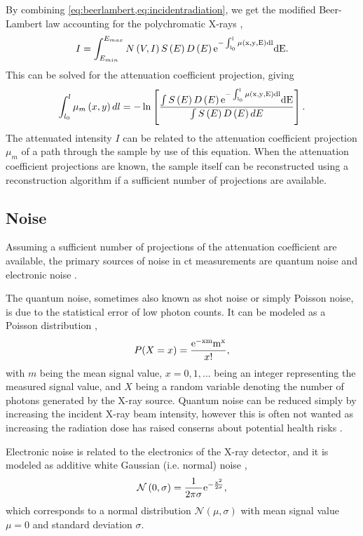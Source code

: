 By combining \cref{eq:beerlambert,eq:incidentradiation}, we get the modified Beer-Lambert law accounting for the polychromatic X-rays \cite{doi:10.1063/1.4950807}, 
\begin{equation}
    I = \int_{E_{min}}^{E_{max}}N\left(V,I\right)S\left(E\right)D\left(E\right)\rm{e}^{-\int_{l_0}^{l}\mu\left(x,y,E\right)dl}dE.
\end{equation}
This can be solved for the attenuation coefficient projection, giving \cite{doi:10.1063/1.4950807}
\begin{equation}
    \label{eq:ctattenuationcoefficient}
    \int_{l_0}^{l} \mu_m\left(x,y\right)dl = -\ln\left[\frac{\int S\left(E\right) D\left(E\right)\rm{e}^{-\int_{l_0}^{l}\mu\left(x,y,E\right)dl} dE }{ \int S\left(E\right) D\left(E\right) dE }\right].
\end{equation}
The attenuated intensity $I$ can be related to the attenuation coefficient projection $\mu_m$ of a path through the sample by use of this equation. When the attenuation coefficient projections are known, the sample itself can be reconstructed using a reconstruction algorithm if a sufficient number of projections are available. 

\subsection{Noise}
Assuming a sufficient number of projections of the attenuation coefficient are available, the primary sources of noise in \acrshort{ct} measurements are quantum noise and electronic noise \cite{boas2012ct}. 

The quantum noise, sometimes also known as shot noise or simply Poisson noise, is due to the statistical error of low photon counts. It can be modeled as a Poisson distribution \cite{Whiting2006},
\begin{equation}
    \label{eq:poissonnoise}
    P(X = x) = \frac{\rm{e}^{-xm}m^x}{x!},
\end{equation}
with $m$ being the mean signal value, $x=0,1,...$ being an integer representing the measured signal value, and $X$ being a random variable denoting the number of photons generated by the X-ray source. Quantum noise can be reduced simply by increasing the incident X-ray beam intensity, however this is often not wanted as increasing the radiation dose has raised conserns about potential health risks \cite{doi:10.1056/NEJMra072149,PEARCE2012499}. 

Electronic noise is related to the electronics of the X-ray detector, and it is modeled as additive white Gaussian (i.e. normal) noise \cite{boas2012ct},
\begin{equation}
    \mathcal{N}\left(0,\sigma \right) = \frac{1}{2\pi\sigma}\rm{e}^{-\frac{x^2}{2\sigma}},
\end{equation}
which corresponds to a normal distribution $\mathcal{N}\left(\mu,\sigma\right)$ with mean signal value $\mu=0$ and standard deviation $\sigma$. 

